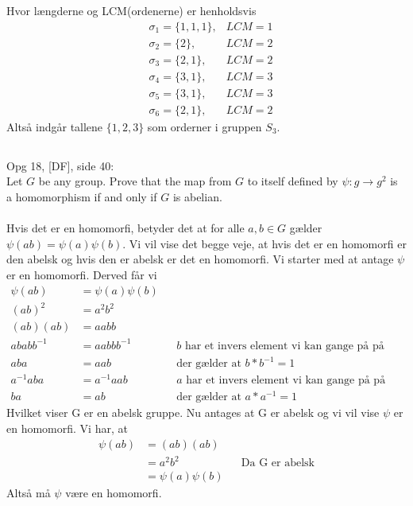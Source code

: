 \documentclass[12pt]{article}
\begin{document}
Hvor længderne og LCM(ordenerne) er henholdsvis
\begin{align*}
&\sigma_1=\{1,1,1\}, &LCM = 1 \\
&\sigma_2=\{2\}, &LCM = 2 \\
&\sigma_3=\{2,1\}, &LCM = 2 \\
&\sigma_4=\{3,1\}, &LCM = 3 \\
&\sigma_5=\{3,1\}, &LCM = 3 \\
&\sigma_6=\{2,1\}, &LCM = 2
\end{align*}
Altså indgår tallene $\{1,2,3\}$ som orderner i gruppen $S_3$.

\newpage 
\subsection{}
Opg 18, [DF], side 40: \\
Let $G$ be any group. Prove that the map from $G$ to itself defined by $\psi: g\rightarrow g^2$ is a homomorphism if and only if $G$ is abelian.\\
\\
Hvis det er en homomorfi, betyder det at for alle $a,b \in G$ gælder $\psi(ab)=\psi(a)\psi(b)$. Vi vil vise det begge veje, at hvis det er en homomorfi er den abelsk og hvis den er abelsk er det en homomorfi. Vi starter med at antage $\psi$ er en homomorfi. Derved får vi
\begin{align*}
\psi(ab)&=\psi(a)\psi(b) \\
(ab)^2&=a^2b^2 \\
(ab)(ab)&=aabb \\
ababb^{-1}&=aabbb^{-1} && b \text{ har et invers element vi kan gange på på begge sider} \\
aba&=aab  && \text{der gælder at } b*b^{-1}=1 \\
a^{-1}aba&=a^{-1}aab  && a \text{ har et invers element vi kan gange på på begge sider} \\
ba&=ab && \text{der gælder at } a*a^{-1}=1
\end{align*}
Hvilket viser G er en abelsk gruppe. Nu antages at G er abelsk og vi vil vise $\psi$ er en homomorfi. Vi har, at
\begin{align*}
\psi(ab)&=(ab)(ab) \\
&=a^2b^2 && \text{Da G er abelsk} \\
&=\psi(a)\psi(b)
\end{align*}
Altså må $\psi$ være en homomorfi.
\end{document}
